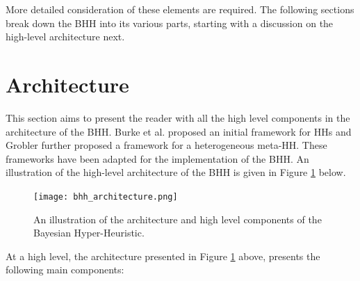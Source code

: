 More detailed consideration of these elements are required. The following sections break down the \Ac{BHH} into its various parts, starting with a discussion on the high-level architecture next.


\section{Architecture}
\label{sec:bhh:architecture}

This section aims to present the reader with all the high level components in the architecture of the \Ac{BHH}. Burke et al. \cite{ref:burke:2010} proposed an initial framework for \acp{HH} and Grobler \cite{ref:grobler:2015} further proposed a framework for a heterogeneous meta-\ac{HH}. These frameworks have been adapted for the implementation of the \Ac{BHH}. An illustration of the high-level architecture of the \Ac{BHH} is given in Figure \ref{fig:bhh_architecture} below.

\begin{figure}[H]
    \centering
    \texttt{[image: bhh\_architecture.png]}
    \caption[The Bayesian Hyper-Heuristic Architecture]{An illustration of
    the architecture and high level components of the Bayesian Hyper-Heuristic.}
    \label{fig:bhh_architecture}
\end{figure}

At a high level, the architecture presented in Figure \ref{fig:bhh_architecture} above, presents the following main components:

